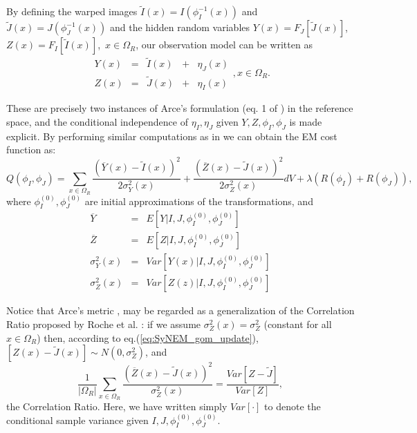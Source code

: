 By defining the warped images \hbox{$\tilde{I}(x) = I(\phi_{I}^{-1}(x))$} and \hbox{$\tilde{J}(x) = J(\phi_{J}^{-1}(x))$} and the hidden random variables
\hbox{$Y(x) = F_{J}\left[\tilde{J}(x)\right]$}, \hbox{$Z(x) = F_{I}\left[\tilde{I}(x)\right]$, $x\in\Omega_{R}$}, our observation model can be written as
\begin{equation}\label{eq:SyNEM_gom_update}
    \begin{array}{ccccc}
    	Y(x) &=& \tilde{I}(x) &+& \eta_{J}(x)\\
        Z(x) &=& \tilde{J}(x) &+& \eta_{I}(x)
    \end{array}, x\in\Omega_{R}.
\end{equation}

These are precisely two instances of Arce's formulation (eq. 1 of \cite{Arce-santana2014}) in the reference space, and the conditional independence of $\eta_{I}, \eta_{J}$
given $Y, Z, \phi_{I}, \phi_{J}$ is made explicit. By performing similar computations as in \cite{Arce-santana2014} we can obtain the EM cost function as:
\begin{equation}\label{eq:SyNEM_energy}
    Q(\phi_{I}, \phi_{J}) = \sum_{x \in \Omega_{R}} \frac{\left(\overline{Y}(x) - \tilde{I}(x)\right)^{2}}{2\sigma^{2}_{Y}(x)} +
                                                     \frac{\left(\overline{Z}(x) - \tilde{J}(x)\right)^{2}}{2\sigma^{2}_{Z}(x)} dV +
                                                     \lambda\left(R(\phi_{I}) + R(\phi_{J})\right),
\end{equation}
where $\phi_{I}^{(0)}, \phi_{J}^{(0)}$ are initial approximations of the transformations, and
\begin{equation}
    \begin{array}{lll}
        \overline{Y} &=& E\left[\left.Y \right| I, J, \phi_{I}^{(0)}, \phi_{J}^{(0)}\right]\\
        \overline{Z} &=& E\left[\left.Z \right| I, J, \phi_{I}^{(0)}, \phi_{J}^{(0)}\right]\\
        \sigma_{Y}^{2}(x) &=& Var\left[\left.Y(x) \right| I, J, \phi_{I}^{(0)}, \phi_{J}^{(0)}\right]\\
        \sigma_{Z}^{2}(x) &=& Var\left[\left.Z(z) \right| I, J, \phi_{I}^{(0)}, \phi_{J}^{(0)}\right]
    \end{array}
\end{equation}

Notice that Arce's metric \cite{Arce-santana2014}, may be regarded as a generalization of the Correlation Ratio proposed by
Roche et al. \cite{Roche1998}: if we assume $\sigma^{2}_{Z}(x) = \sigma^{2}_{Z}$ (constant for all $x\in\Omega_{R}$) then, according to
eq.(\ref{eq:SyNEM_gom_update}),\hbox{$\left[Z(x) - \tilde{J}(x)\right] \sim N(0, \sigma^{2}_{Z})$}, and
\begin{equation}
    \frac{1}{|\Omega_{R}|}\sum_{x \in \Omega_{R}} \frac{\left(\overline{Z}(x) - \tilde{J}(x)\right)^{2}}{\sigma^{2}_{Z}(x)} =
    \frac{Var\left[Z - \tilde{J}\right]}{Var\left[Z\right]},
\end{equation}
the Correlation Ratio. Here, we have written simply $Var[\cdot]$ to denote the conditional sample variance given $ I, J, \phi_{I}^{(0)}, \phi_{J}^{(0)}$.\\

